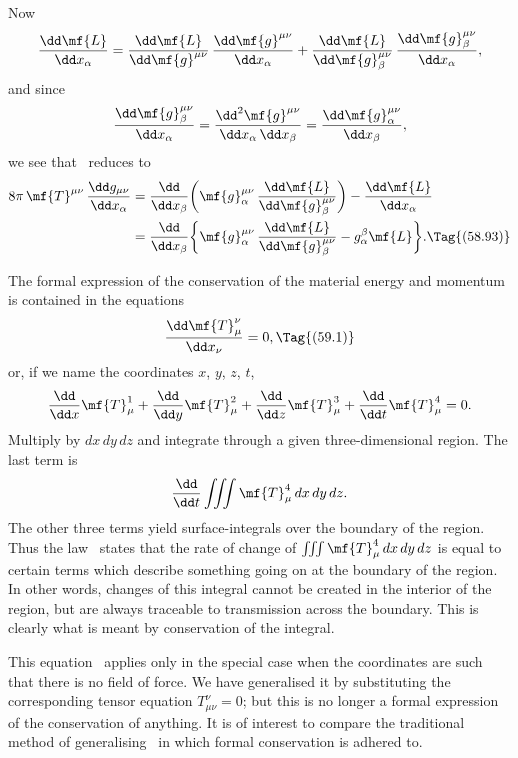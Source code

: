 \documentclass[12pt]{book}
\begin{document}
Now
\[
\frac{\dd\mf{L}}{\dd x_{\alpha}}
= \frac{\dd\mf{L}}{\dd\mf{g}^{\mu\nu}}\, \frac{\dd\mf{g}^{\mu\nu}}{\dd x_{\alpha}}
+ \frac{\dd\mf{L}}{\dd\mf{g}_{\beta}^{\mu\nu}}\, \frac{\dd\mf{g}_{\beta}^{\mu\nu}}{\dd x_{\alpha}},
\]
and since
\[
\frac{\dd\mf{g}_{\beta}^{\mu\nu}}{\dd x_{\alpha}}
= \frac{\dd^{2}\mf{g}^{\mu\nu}}{\dd x_{\alpha}\, \dd x_{\beta}}
= \frac{\dd\mf{g}_{\alpha}^{\mu\nu}}{\dd x_{\beta}},
\]
we see that ~reduces to
\begin{align*}
  8\pi\, \mf{T}^{\mu\nu}\, \frac{\dd g_{\mu\nu}}{\dd x_{\alpha}}
  &= \frac{\dd}{\dd x_{\beta}} \biggl(\mf{g}_{\alpha}^{\mu\nu}\, \frac{\dd\mf{L}}{\dd\mf{g}_{\beta}^{\mu\nu}}\biggr)
  - \frac{\dd\mf{L}}{\dd x_{\alpha}} \\
  &= \frac{\dd}{\dd x_{\beta}} \biggl\{\mf{g}_{\alpha}^{\mu\nu}\, \frac{\dd\mf{L}}{\dd\mf{g}_{\beta}^{\mu\nu}}
  - g_{\alpha}^{\beta}\mf{L}\biggr\}.
  \Tag{(58.93)}
\end{align*}


The formal expression of the conservation of the material energy and
%
momentum is contained in the equations
\[
\frac{\dd\mf{T}_{\mu}^{\nu}}{\dd x_{\nu}} = 0,
\Tag{(59.1)}
\]
or, if we name the coordinates $x$, $y$, $z$, $t$,
\[
\frac{\dd}{\dd x}\mf{T}_{\mu}^{1}
+ \frac{\dd}{\dd y}\mf{T}_{\mu}^{2}
+ \frac{\dd}{\dd z}\mf{T}_{\mu}^{3}
+ \frac{\dd}{\dd t}\mf{T}_{\mu}^{4} = 0.
\]
Multiply by $dx\, dy\, dz$ and integrate through a given three\hyp{}dimensional region.
The last term is
\[
\frac{\dd}{\dd t} \iiint \mf{T}_{\mu}^{4}\, dx\, dy\, dz.
\]
The other three terms yield surface\hyp{}integrals over the boundary of the region.
Thus the law~ states that the rate of change of $\iiint \mf{T}_{\mu}^{4}\, dx\, dy\, dz$ is equal to
certain terms which describe something going on at the boundary of the region.
In other words, changes of this integral cannot be created in the interior of
the region, but are always traceable to transmission across the boundary. This
is clearly what is meant by conservation of the integral.

This equation~ applies only in the special case when the coordinates
are such that there is no field of force. We have generalised it by substituting
the corresponding tensor equation $T_{\mu\nu}^{\nu} = 0$; but this is no longer a formal expression
of the conservation of anything. It is of interest to compare the
traditional method of generalising~ in which formal conservation is
adhered to.
\end{document}
